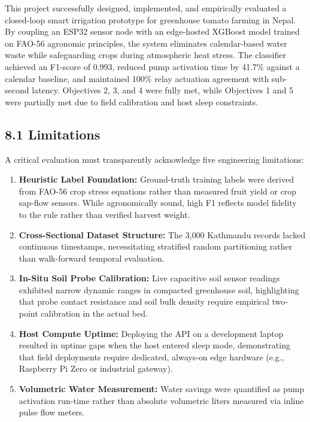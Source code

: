 \documentclass[12pt, a4paper]{article}
\begin{document}
This project successfully designed, implemented, and empirically evaluated a closed-loop smart irrigation prototype for greenhouse tomato farming in Nepal. By coupling an ESP32 sensor node with an edge-hosted XGBoost model trained on FAO-56 agronomic principles, the system eliminates calendar-based water waste while safeguarding crops during atmospheric heat stress. The classifier achieved an F1-score of 0.993, reduced pump activation time by 41.7\% against a calendar baseline, and maintained 100\% relay actuation agreement with sub-second latency. Objectives 2, 3, and 4 were fully met, while Objectives 1 and 5 were partially met due to field calibration and host sleep constraints.

\subsection{8.1 Limitations}
\label{sec:limitations}

A critical evaluation must transparently acknowledge five engineering limitations:
\begin{enumerate}[leftmargin=1.2cm, itemsep=3pt]
    \item \textbf{Heuristic Label Foundation:} Ground-truth training labels were derived from FAO-56 crop stress equations rather than measured fruit yield or crop sap-flow sensors. While agronomically sound, high F1 reflects model fidelity to the rule rather than verified harvest weight.
    \item \textbf{Cross-Sectional Dataset Structure:} The 3{,}000 Kathmandu records lacked continuous timestamps, necessitating stratified random partitioning rather than walk-forward temporal evaluation.
    \item \textbf{In-Situ Soil Probe Calibration:} Live capacitive soil sensor readings exhibited narrow dynamic ranges in compacted greenhouse soil, highlighting that probe contact resistance and soil bulk density require empirical two-point calibration in the actual bed.
    \item \textbf{Host Compute Uptime:} Deploying the API on a development laptop resulted in uptime gaps when the host entered sleep mode, demonstrating that field deployments require dedicated, always-on edge hardware (e.g., Raspberry Pi Zero or industrial gateway).
    \item \textbf{Volumetric Water Measurement:} Water savings were quantified as pump activation run-time rather than absolute volumetric liters measured via inline pulse flow meters.
\end{enumerate}
\end{document}
